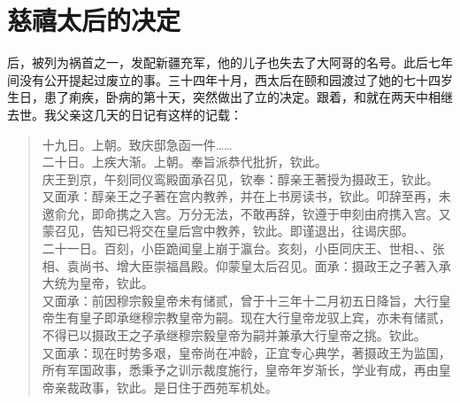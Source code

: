 \fancyhead[RO]{} %
\fancyhead[LE]{} %
\chapter*{慈禧太后的决定}
\thispagestyle{empty}
后，被列为祸首之一，发配新疆充军，他的儿子也失去了大阿哥的名号。此后七年间没有公开提起过废立的事。三十四年十月，西太后在颐和园渡过了她的七十四岁生日，患了痢疾，卧病的第十天，突然做出了立的决定。跟着，和就在两天中相继去世。我父亲这几天的日记有这样的记载：\\

\begin{quote}
	十九日。上朝。致庆邸急函一件……\\

二十日。上疾大渐。上朝。奉旨派恭代批折，钦此。\\

庆王到京，午刻同仪鸾殿面承召见，钦奉：醇亲王著授为摄政王，钦此。\\

又面承：醇亲王之子著在宫内教养，并在上书房读书，钦此。叩辞至再，未邀俞允，即命携之入宫。万分无法，不敢再辞，钦遵于申刻由府携入宫。又蒙召见，告知已将交在皇后宫中教养，钦此。即谨退出，往谒庆邸。\\

二十一日。百刻，小臣跪闻皇上崩于瀛台。亥刻，小臣同庆王、世相、、张相、袁尚书、增大臣崇福昌殿。仰蒙皇太后召见。面承：摄政王之子著入承大统为皇帝，钦此。\\

又面承：前因穆宗毅皇帝未有储贰，曾于十三年十二月初五日降旨，大行皇帝生有皇子即承继穆宗教皇帝为嗣。现在大行皇帝龙驭上宾，亦未有储贰，不得已以摄政王之子承继穆宗毅皇帝为嗣并兼承大行皇帝之挑。钦此。\\

又面承：现在时势多艰，皇帝尚在冲龄，正宜专心典学，著摄政王为监国，所有军国政事，悉秉予之训示裁度施行，皇帝年岁渐长，学业有成，再由皇帝亲裁政事，钦此。是日住于西苑军机处。\\
\end{quote}

